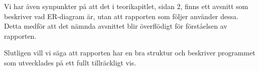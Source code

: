 \documentclass[a4paper, 12pt]{article}
\begin{document}
Vi har även synpunkter på att det i teorikapitlet, sidan 2, finns ett avsnitt som beskriver vad ER-diagram är, utan att rapporten som följer använder dessa. Detta medför att det nämnda avsnittet blir överflödigt för förståelsen av rapporten.

Slutligen vill vi säga att rapporten har en bra struktur och beskriver programmet som utvecklades på ett fullt tillräckligt vis. 
\end{document}
